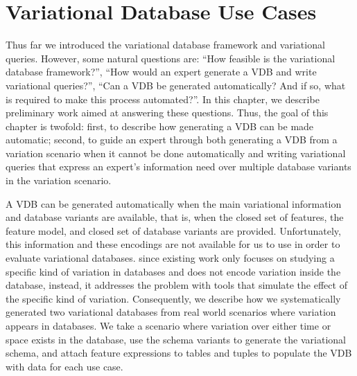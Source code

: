 \chapter{Variational Database Use Cases}
\label{ch:vdbusecase}


Thus far we introduced the variational database framework and variational
queries. However, some natural questions are: ``How feasible is the variational
database framework?'', ``How would an expert generate a VDB and write 
variational queries?'', ``Can a VDB be generated automatically? And if so,
what is required to make this process automated?''. 
%
In this chapter, we describe preliminary work aimed at answering these questions.
Thus, the goal of this chapter is twofold: 
first, to describe how generating a VDB can be made automatic;
second, to guide an expert through both generating a VDB
from a variation scenario when it cannot be done automatically and
writing variational queries that express an expert's information need over
multiple database variants in the variation scenario.
%

A VDB can be generated automatically when the main variational information and
database variants are available, that is, when the closed set of features, the
feature model, and closed set of database variants are provided.
%
Unfortunately, this information and these encodings are not available 
for us to use in order to evaluate variational databases.
since existing work only focuses on studying a specific 
kind of variation in databases and does not encode variation inside the database,
instead, it addresses the problem with tools that simulate the effect of the
specific kind of variation.
Consequently, we describe how we systematically generated two 
variational databases from real world scenarios where variation appears
in databases. We take a scenario where variation over either time or space
exists in the database, use the schema variants to generate the variational schema, 
and attach feature expressions to tables and tuples to populate the VDB with
data for each use case. 


